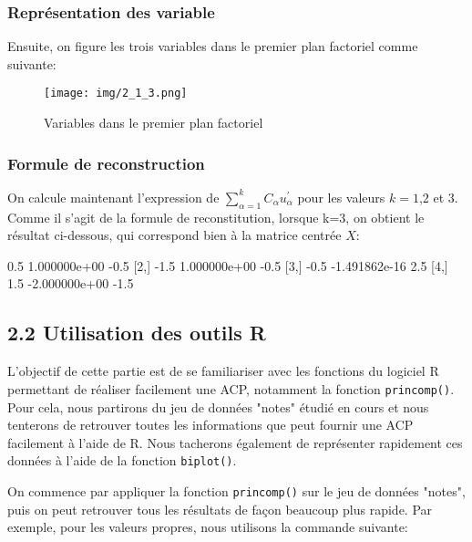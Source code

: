 \documentclass{article}
\begin{document}
\begin{multicols}{2}
	\subsubsection{Représentation des variable}
	
	Ensuite, on figure les trois variables dans le premier plan factoriel comme suivante:
	\begin{figure}[H]
		\centering
		\texttt{[image: img/2\_1\_3.png]}
		\caption{Variables dans le premier plan factoriel}
		\label{fig:variables dans le premier plan factoriel}
	\end{figure}

	\subsubsection{Formule de reconstruction}
	
	On calcule maintenant l'expression de $\sum _{ \alpha =1 }^{ k }{C_{ \alpha }u_{\alpha}^{'} } $ pour les valeurs $k=1$,$2$ et $3$. Comme il s'agit de la formule de reconstitution, lorsque k=3, on obtient le résultat ci-dessous, qui correspond bien à la matrice centrée $X$:
	
	\begin{mdframed}	
\begin{footnotesize}
\begin{Schunk}
\begin{Soutput}
     [,1]          [,2] [,3]
[1,]  0.5  1.000000e+00 -0.5
[2,] -1.5  1.000000e+00 -0.5
[3,] -0.5 -1.491862e-16  2.5
[4,]  1.5 -2.000000e+00 -1.5
\end{Soutput}
\end{Schunk}
\end{footnotesize}
    \end{mdframed}

	\subsection*{2.2 Utilisation des outils R}
	L'objectif de cette partie est de se familiariser avec les fonctions du logiciel R permettant de réaliser facilement une ACP, notamment la fonction \verb|princomp()|. Pour cela, nous partirons du jeu de données "notes" étudié en cours et nous tenterons de retrouver toutes les informations que peut fournir une ACP facilement à l'aide de R. Nous tacherons également de représenter rapidement ces données à l'aide de la fonction \verb|biplot()|.
	
    On commence par appliquer la fonction \verb|princomp()| sur le jeu de données "notes", puis on peut retrouver tous les résultats de façon beaucoup plus rapide. Par exemple, pour les valeurs propres, nous utilisons la commande suivante:


\end{multicols}
\end{document}
